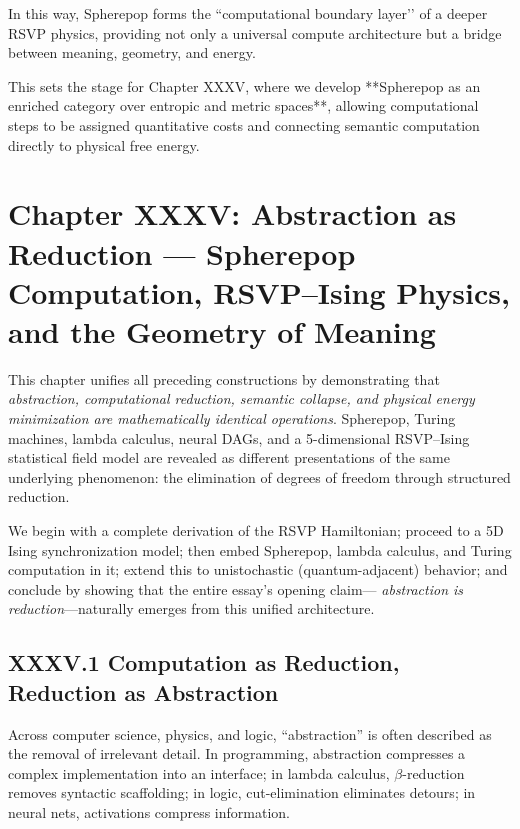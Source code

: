 \documentclass[11pt,letterpaper]{article}
\begin{document}
In this way, Spherepop forms the ``computational boundary layer’’ of a deeper RSVP physics, providing not only a universal compute architecture but a bridge between meaning, geometry, and energy.

This sets the stage for Chapter XXXV, where we develop **Spherepop as an enriched category over entropic and metric spaces**, allowing computational steps to be assigned quantitative costs and connecting semantic computation directly to physical free energy.

\newpage

\section{Chapter XXXV: Abstraction as Reduction —  
Spherepop Computation, RSVP–Ising Physics, and the Geometry of Meaning}

This chapter unifies all preceding constructions by demonstrating that 
\emph{abstraction, computational reduction, semantic collapse, 
and physical energy minimization are mathematically identical operations}.  
Spherepop, Turing machines, lambda calculus, neural DAGs, and 
a 5-dimensional RSVP–Ising statistical field model 
are revealed as different presentations of the same underlying phenomenon:
the elimination of degrees of freedom through structured reduction.

We begin with a complete derivation of the RSVP Hamiltonian; proceed to 
a 5D Ising synchronization model; then embed 
Spherepop, lambda calculus, and Turing computation in it; 
extend this to unistochastic (quantum-adjacent) behavior; 
and conclude by showing that the entire essay's opening claim—
\emph{abstraction is reduction}—naturally emerges from this unified architecture.

\subsection{XXXV.1 Computation as Reduction, Reduction as Abstraction}

Across computer science, physics, and logic, ``abstraction'' is often described as 
the removal of irrelevant detail. In programming, abstraction compresses a complex implementation
into an interface; in lambda calculus, $\beta$-reduction removes syntactic scaffolding; 
in logic, cut-elimination eliminates detours; in neural nets, activations compress information.  
\end{document}
